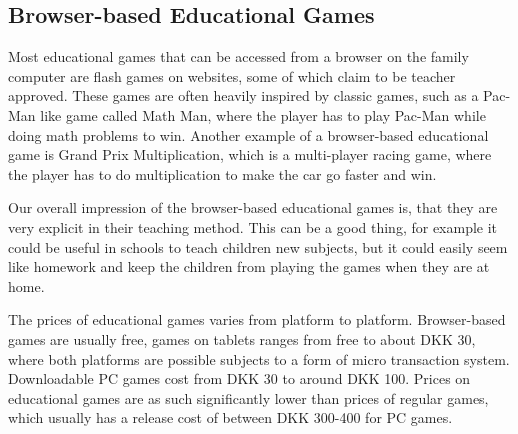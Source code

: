 \subsection{Browser-based Educational Games}
Most educational games that can be accessed from a browser on the family computer are flash games on websites, some of which claim to be teacher approved.
These games are often heavily inspired by classic games, such as a Pac-Man like game called Math Man, where the player has to play Pac-Man while doing math problems to win.\cite{mathman} Another example of a browser-based educational game is Grand Prix Multiplication, which is a multi-player racing game, where the player has to do multiplication to make the car go faster and win.\cite{grandprix}\newline

Our overall impression of the browser-based educational games is, that they are very explicit in their teaching method.
This can be a good thing, for example it could be useful in schools to teach children new subjects, but it could easily seem like homework and keep the children from playing the games when they are at home.\newline

The prices of educational games varies from platform to platform. 
Browser-based games are usually free, games on tablets ranges from free to about DKK 30, where both platforms are possible subjects to a form of micro transaction system.
Downloadable PC games cost from DKK 30 to around DKK 100.
Prices on educational games are as such significantly lower than prices of regular games, which usually has a release cost of between DKK 300-400 for PC games.